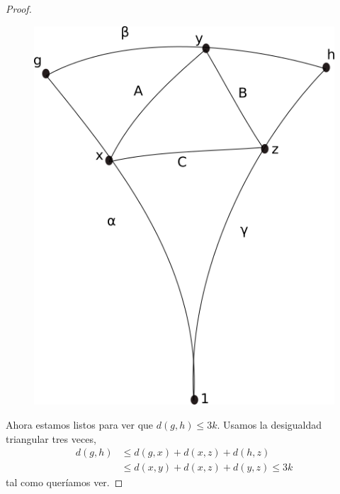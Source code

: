\documentclass[tesis.tex]{subfiles}
\begin{document}
\begin{proof}
	\begin{figure}[H]
		\centering
		\includegraphics[scale=0.5]{treewidth.png}
		\caption*{}
	\end{figure}
	
	
	
	Ahora estamos listos para ver que $d(g,h) \le 3k$. Usamos la desigualdad triangular tres veces,
	\begin{align*}
		d(g,h) & \le d(g,x) + d(x,z) + d(h,z) \\
		& \le d(x,y) + d(x,z) + d(y,z) \le 3k
	\end{align*}
	tal como queríamos ver.
\end{proof}
	
	
\end{document}
